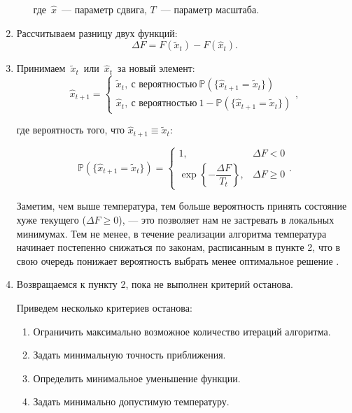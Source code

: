\begin{enumerate}
\begin{enumerate}
		где~$\widehat{x}$~--- параметр сдвига, $T$~--- параметр масштаба.

	\end{enumerate}

	\item Рассчитываем разницу двух функций:
	\[
	\Delta F =
	F(\tilde{x}_t)
	-
	F(\widehat{x}_t).
	\]

	\item Принимаем~$\tilde{x}_t$~или~$\widehat{x}_t$~за новый элемент:
	\[
		\widehat{x}_{t+1}
		=
		\begin{cases}
			\tilde{x}_t,\ \text{с вероятностью}\ \mathbb{P}(\{\widehat{x}_{t+1} = \tilde{x}_t\}) \\
			\widehat{x}_t,\ \text{с вероятностью}\ 1 - \mathbb{P}(\{\widehat{x}_{t+1} = \tilde{x}_t\})
		\end{cases},
	\]

 где вероятность того, что $\widehat{x}_{t+1} \equiv \tilde{x}_t$:

	\begin{equation}
	\mathbb{P}(\{\widehat{x}_{t+1} = \tilde{x}_t\})
	=
	\begin{cases}
	1,
	&
	\Delta F <0
	\\
	\exp
	\left\lbrace
	- \dfrac {\Delta F}{T_t}
	\right\rbrace ,
	&
	\Delta F \geqslant 0
	\end{cases}.
	\end{equation}

	Заметим, чем выше температура, тем больше вероятность принять состояние хуже текущего ($\Delta F \geqslant 0$), --- это позволяет нам не застревать в локальных минимумах. Тем не менее, в течение реализации алгоритма температура начинает постепенно снижаться по законам, расписанным в пункте 2, что в свою очередь понижает вероятность выбрать менее оптимальное решение .

	\item Возвращаемся к пункту 2, пока не выполнен критерий останова.

	Приведем несколько критериев останова:
	\begin{enumerate}.
		\item Ограничить максимально возможное количество итераций алгоритма.
		\item Задать минимальную точность приближения.
		\item Определить минимальное уменьшение функции.
		\item Задать минимально допустимую температуру.
	\end{enumerate}
\end{enumerate}

